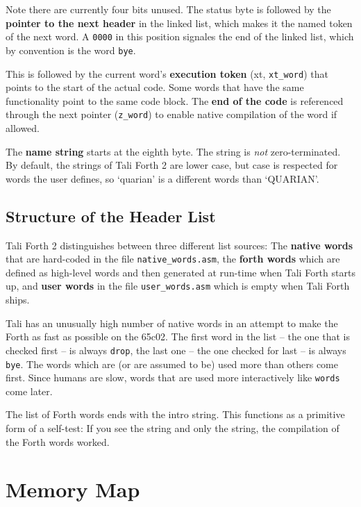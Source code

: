 Note there are currently four bits unused. The status byte is followed by the
\textbf{pointer to the next header} in the linked list, which makes it the named
token of the next word. A \texttt{0000} in this position signales the end of the
linked list, which by convention is the word \texttt{bye}. 

This is followed by the current word's \textbf{execution token} (xt,
\texttt{xt\_word}) that points to the start of the actual code. Some words that
have the same functionality point to the same code block. The \textbf{end of the
code} is referenced through the next pointer (\texttt{z\_word}) to enable native
compilation of the word if allowed. 

The \textbf{name string} starts at the eighth byte. The string is \textit{not}
zero-terminated. By default, the strings of Tali Forth 2 are lower case, but
case is respected for words the user defines, so `quarian' is a different words
than `QUARIAN'. 


\subsection{Structure of the Header List}

Tali Forth 2 distinguishes between three different list sources: The
\textbf{native words} that are hard-coded in the file
\texttt{native\_words.asm}, the \textbf{forth words} which are defined as
high-level words and then generated at run-time when Tali Forth starts up, and
\textbf{user words} in the file \texttt{user\_words.asm} which is empty when
Tali Forth ships. 

Tali has an unusually high number of native words in an attempt to make the
Forth as fast as possible on the 65c02. The first word in the list -- the one
that is checked first -- is always \texttt{drop}, the last one -- the one
checked for last -- is always \texttt{bye}. The words which are (or are assumed
to be) used more than others come first. Since humans are slow, words that are
used more interactively like \texttt{words} come later. 

The list of Forth words ends with the intro string. This functions as a
primitive form of a self-test: If you see the string and only the string, the
compilation of the Forth words worked.


\section{Memory Map}


